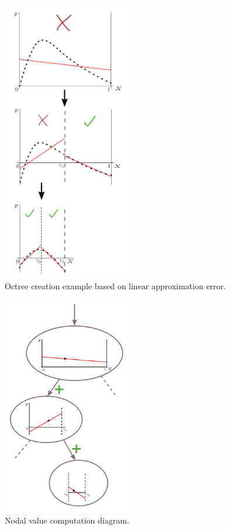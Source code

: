 \begin{figure}[H]
\centering
\includegraphics[width=0.5\textwidth]{figures/appendix-approximation/figure5}
\decoRule
\caption[Octree creation]{Octree creation example based on linear approximation error.}
\label{fig:octree-creation}
\end{figure}

\begin{figure}[H]
\centering
\includegraphics[width=0.5\textwidth]{figures/appendix-approximation/figure6}
\decoRule
\caption[Nodal value computation]{Nodal value computation diagram.}
\label{fig:nodal-value-computation}
\end{figure}

